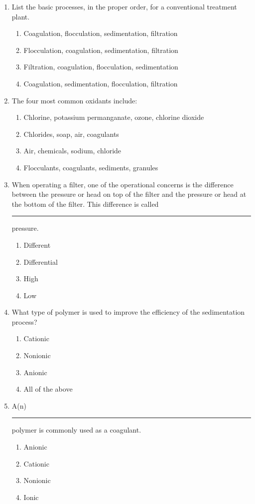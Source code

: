 \begin{enumerate}
\item List the basic processes, in the proper order, for a conventional treatment plant.
\begin{enumerate}
\item Coagulation, flocculation, sedimentation, filtration
\item Flocculation, coagulation, sedimentation, filtration
\item Filtration, coagulation, flocculation, sedimentation
\item Coagulation, sedimentation, flocculation, filtration
\end{enumerate}

\item The four most common oxidants include:
\begin{enumerate}
\item Chlorine, potassium permanganate, ozone, chlorine dioxide
\item Chlorides, soap, air, coagulants
\item Air, chemicals, sodium, chloride
\item Flocculants, coagulants, sediments, granules
\end{enumerate}

\item  When operating a filter, one of the operational concerns is the difference between the pressure or head on top of the filter and the pressure or head at the bottom of the filter. This difference is called \rule{2cm}{0.3pt} pressure.
\begin{enumerate}
\item Different
\item Differential
\item High
\item Low
\end{enumerate}

\item  What type of polymer is used to improve the efficiency of the sedimentation
process?
\begin{enumerate}
\item Cationic
\item Nonionic
\item Anionic
\item All of the above
\end{enumerate}

\item A(n) \rule{2cm}{0.3pt} polymer is commonly used as a coagulant.
\begin{enumerate}
\item Anionic
\item Cationic
\item Nonionic
\item Ionic
\end{enumerate}



\end{enumerate}
